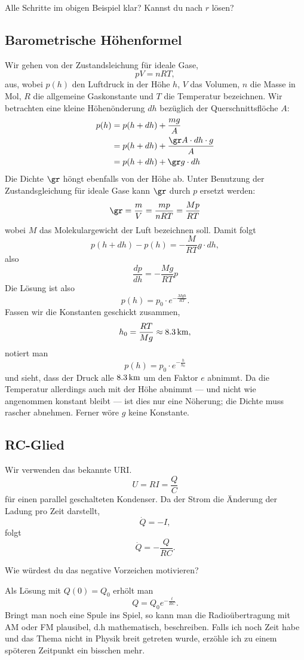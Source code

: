 \documentclass[%
draft,
11pt,%
twoside,%
titlepage,%
german,%
headsepline%
]{scrartcl}
\begin{document}
\begin{ueb}
Alle Schritte im obigen Beispiel klar? Kannst du nach $r$ l\"osen?
\end{ueb}

\subsection{Barometrische H\"ohenformel}

Wir
gehen von der Zustandsleichung f\"ur ideale Gase,
$$pV=nRT,$$
aus, wobei $p(h)$ den Luftdruck in der H\"ohe $h$, $V$ das Volumen, $n$ die Masse in Mol, $R$ die allgemeine Gaskonstante und $T$ die Temperatur bezeichnen. Wir betrachten eine kleine H\"ohen\"onderung $dh$ bez\"uglich der Querschnittsfl\"oche $A$:
\begin{align*}
p(h) &= p(h+dh)+\frac{mg}{A}\\
 &=p(h+dh)+\frac{\gr A\cdot dh\cdot g}{A}\\
 &= p(h+dh) + \gr g\cdot dh
 \end{align*}
Die Dichte $\gr$ h\"ongt ebenfalls von der H\"ohe ab. Unter Benutzung der Zustandsgleichung f\"ur ideale Gase kann $\gr$ durch $p$ ersetzt werden:
$$\gr=\frac{m}{V}=\frac{mp}{nRT}=\frac{Mp}{RT}$$
wobei $M$ das Molekulargewicht der Luft bezeichnen soll. Damit folgt
$$p(h+dh)-p(h)=-\frac{M}{RT}g\cdot dh,$$
also
$$\frac{dp}{dh}=-\frac{Mg}{RT}p$$
Die L\"osung ist also
$$p(h)=p_0\cdot e^{-\frac{Mgh}{RT}}.$$
Fassen wir die Konstanten geschickt zusammen,
$$h_0=\frac{RT}{Mg}\approx\unit[8.3]{km},$$
notiert man
$$p(h)=p_0\cdot e^{-\frac{h}{h_0}}$$
und sieht, dass der Druck alle $\unit[8.3]{km}$ um den Faktor $e$ abnimmt. Da die Temperatur allerdings auch mit der H\"ohe abnimmt --- und nicht wie angenommen konstant bleibt --- ist dies nur eine N\"oherung; die Dichte muss rascher abnehmen. Ferner w\"ore $g$ keine Konstante.

\subsection{RC-Glied}

Wir
verwenden das bekannte URI.
$$U=RI=\frac{Q}{C}$$
f\"ur einen parallel geschalteten Kondenser. Da der Strom die \"Anderung der Ladung pro Zeit darstellt,
$$\dot{Q}=-I,$$
folgt
$$\dot{Q}=-\frac{Q}{RC}.$$
\begin{ueb}
Wie w\"urdest du das negative Vorzeichen motivieren?
\end{ueb}
\noindent Als L\"osung mit $Q(0)=Q_0$ erh\"olt man
$$Q=Q_0 e^{-\frac{t}{RC}}.$$
Bringt man noch eine Spule ins Spiel, so kann man die Radio\"ubertragung mit AM oder FM plausibel, d.h mathematisch, beschreiben. Falls ich noch Zeit habe und das Thema nicht in Physik breit getreten wurde, erz\"ohle ich zu einem sp\"oteren Zeitpunkt ein bisschen mehr.
\end{document}
